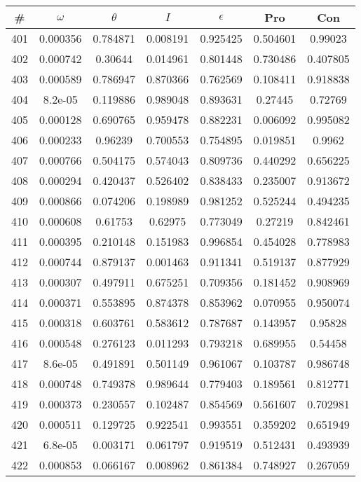 \newpage
\begin{table}
\begin{tabular}{c|c|c|c|c|c|c}
\# & $\omega$ & $\theta$ & $I$ & $\epsilon$ & Pro & Con\\
\hline
401 & 0.000356 & 0.784871 & 0.008191 & 0.925425 & 0.504601 & 0.99023\\
402 & 0.000742 & 0.30644 & 0.014961 & 0.801448 & 0.730486 & 0.407805\\
403 & 0.000589 & 0.786947 & 0.870366 & 0.762569 & 0.108411 & 0.918838\\
404 & 8.2e-05 & 0.119886 & 0.989048 & 0.893631 & 0.27445 & 0.72769\\
405 & 0.000128 & 0.690765 & 0.959478 & 0.882231 & 0.006092 & 0.995082\\
406 & 0.000233 & 0.96239 & 0.700553 & 0.754895 & 0.019851 & 0.9962\\
407 & 0.000766 & 0.504175 & 0.574043 & 0.809736 & 0.440292 & 0.656225\\
408 & 0.000294 & 0.420437 & 0.526402 & 0.838433 & 0.235007 & 0.913672\\
409 & 0.000866 & 0.074206 & 0.198989 & 0.981252 & 0.525244 & 0.494235\\
410 & 0.000608 & 0.61753 & 0.62975 & 0.773049 & 0.27219 & 0.842461\\
411 & 0.000395 & 0.210148 & 0.151983 & 0.996854 & 0.454028 & 0.778983\\
412 & 0.000744 & 0.879137 & 0.001463 & 0.911341 & 0.519137 & 0.877929\\
413 & 0.000307 & 0.497911 & 0.675251 & 0.709356 & 0.181452 & 0.908969\\
414 & 0.000371 & 0.553895 & 0.874378 & 0.853962 & 0.070955 & 0.950074\\
415 & 0.000318 & 0.603761 & 0.583612 & 0.787687 & 0.143957 & 0.95828\\
416 & 0.000548 & 0.276123 & 0.011293 & 0.793218 & 0.689955 & 0.54458\\
417 & 8.6e-05 & 0.491891 & 0.501149 & 0.961067 & 0.103787 & 0.986748\\
418 & 0.000748 & 0.749378 & 0.989644 & 0.779403 & 0.189561 & 0.812771\\
419 & 0.000373 & 0.230557 & 0.102487 & 0.854569 & 0.561607 & 0.702981\\
420 & 0.000511 & 0.129725 & 0.922541 & 0.993551 & 0.359202 & 0.651949\\
421 & 6.8e-05 & 0.003171 & 0.061797 & 0.919519 & 0.512431 & 0.493939\\
422 & 0.000853 & 0.066167 & 0.008962 & 0.861384 & 0.748927 & 0.267059\\

\end{tabular}
\end{table}
